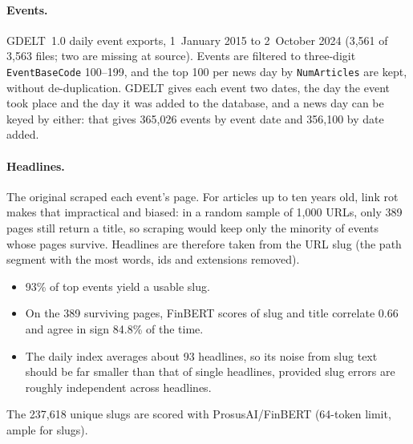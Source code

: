 \documentclass[11pt]{article}
\begin{document}
\paragraph{Events.} GDELT~1.0 daily event exports, 1~January 2015 to 2~October 2024 (3,561 of 3,563 files; two are
missing at source). Events are filtered to three-digit \texttt{EventBaseCode} 100--199, and the top 100 per news day
by \texttt{NumArticles} are kept, without de-duplication. GDELT gives each event two dates, the day the event took
place and the day it was added to the database, and a news day can be keyed by either: that gives 365,026 events by
event date and 356,100 by date added.

\paragraph{Headlines.} The original scraped each event's page. For articles up to ten years old, link rot makes that
impractical and biased: in a random sample of 1,000 URLs, only 389 pages still return a title, so scraping would keep
only the minority of events whose pages survive. Headlines are therefore taken from the URL slug (the path segment
with the most words, ids and extensions removed).
\begin{itemize}
  \item 93\% of top events yield a usable slug.
  \item On the 389 surviving pages, FinBERT scores of slug and title correlate 0.66 and agree in sign 84.8\% of the
        time.
  \item The daily index averages about 93 headlines, so its noise from slug text should be far smaller than
        that of single headlines, provided slug errors are roughly independent across headlines.
\end{itemize}
The 237,618 unique slugs are scored with ProsusAI/FinBERT (64-token limit, ample for slugs).
\end{document}
